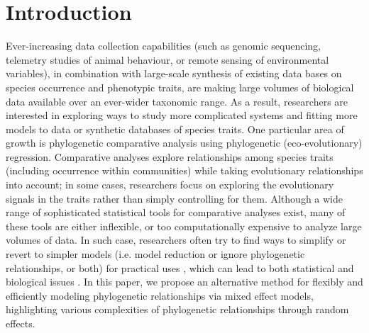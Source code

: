 \section{Introduction}

Ever-increasing data collection capabilities (such as genomic sequencing, telemetry studies of animal behaviour, or remote sensing of environmental variables), in combination with large-scale synthesis of existing data bases on species occurrence and phenotypic traits, are making large volumes of biological data available over an ever-wider taxonomic range.
As a result, researchers are interested in exploring ways to study more complicated systems and fitting more models to data or synthetic databases of species traits.
One particular area of growth is phylogenetic comparative analysis using phylogenetic (eco-evolutionary) regression. Comparative analyses explore relationships among species traits (including occurrence within communities) while taking evolutionary relationships into account; in some cases, researchers focus on exploring the evolutionary signals in the traits rather than simply controlling for them.
Although a wide range of sophisticated statistical tools for comparative analyses exist, many of these tools are either inflexible, or too computationally expensive to analyze large volumes of data.
In such case, researchers often try to find ways to simplify or revert to simpler models (i.e. model reduction or ignore phylogenetic relationships, or both) for practical uses \cite{bunnefeld2012island, ord2010adaptation},
which can lead to both statistical and biological issues \cite{felsenstein1985phylogenies, li2017statistical}. 
In this paper, we propose an alternative method for flexibly and efficiently modeling phylogenetic relationships via mixed effect models, highlighting various complexities of phylogenetic relationships through random effects.

